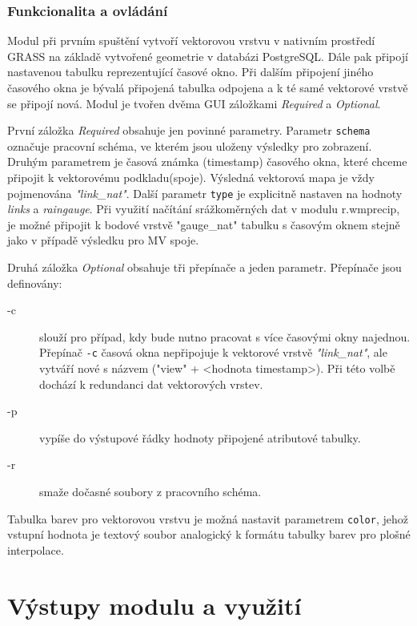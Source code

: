 \documentclass[a4paper,12pt,oneside]{report}
\begin{document}
\subsubsection{Funkcionalita a ovládání}
Modul při prvním spuštění vytvoří vektorovou vrstvu v nativním prostředí GRASS na základě vytvořené geometrie v databázi PostgreSQL. Dále pak připojí nastavenou tabulku reprezentující časové okno. Při dalším připojení jiného časového okna je bývalá připojená tabulka odpojena a k té samé vektorové vrstvě se připojí nová. Modul je tvořen dvěma GUI záložkami \textit{Required} a \textit{Optional}. 

První záložka \textit{Required} obsahuje jen povinné parametry.  Parametr \texttt{schema}  označuje pracovní schéma, ve kterém jsou uloženy výsledky pro  zobrazení. Druhým parametrem je časová známka (timestamp) časového okna, které chceme připojit k vektorovému podkladu(spoje). Výsledná vektorová mapa je vždy pojmenována \textit{"link\_nat"}. Další parametr  \texttt{type} je  explicitně nastaven na hodnoty \emph{links} a \emph{raingauge}. Při využití načítání srážkoměrných dat v modulu r.wmprecip, je možné připojit k bodové vrstvě "gauge\_nat" tabulku s časovým oknem stejně jako v případě výsledku pro MV spoje.

Druhá záložka \textit{Optional} obsahuje  tři přepínače a jeden parametr.  Přepínače jsou definovány:
\begin{description}
\item[-c]   slouží pro případ, kdy bude nutno pracovat s více časovými okny najednou. Přepínač \texttt{-c} časová okna nepřipojuje k vektorové vrstvě \textit{"link\_nat"}, ale vytváří nové s názvem ("view" + <hodnota timestamp>). Při této volbě dochází k redundanci dat vektorových vrstev.
\item[-p] vypíše do výstupové řádky hodnoty připojené atributové tabulky.
\item[-r] smaže dočasné  soubory z pracovního schéma.
\end{description}

Tabulka barev pro vektorovou vrstvu je možná nastavit parametrem \texttt{color}, jehož vstupní hodnota je textový soubor  analogický k formátu tabulky barev pro plošné interpolace.




\newpage
\setcounter{footnote}{1}
\section{Výstupy modulu a využití}
\end{document}
